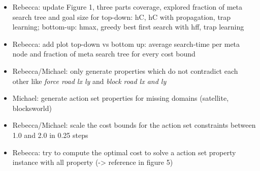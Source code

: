 \documentclass{article}
\begin{document}
\begin{itemize}
\item Rebecca: update Figure 1, three parts coverage, explored fraction of meta search tree and goal size for top-down: hC, hC with propagation, trap learning; bottom-up: hmax, greedy best first search with hff, trap learning
\item Rebecca: add plot top-down vs bottom up: average search-time per meta node and fraction of meta search tree for every cost bound
\item Rebecca/Michael: only generate properties which do not contradict each other like \emph{force road lx ly} and \emph{block road lx and ly} 
\item Michael: generate action set properties for missing domains (satellite, blocksworld) 
\item Rebecca/Michael: scale the cost bounds for the action set constraints between 1.0 and 2.0 in 0.25 steps
\item Rebecca: try to compute the optimal cost to solve a action set property instance with all property (-> reference in figure 5) 
\end{itemize}












\FloatBarrier







%



\end{document}
